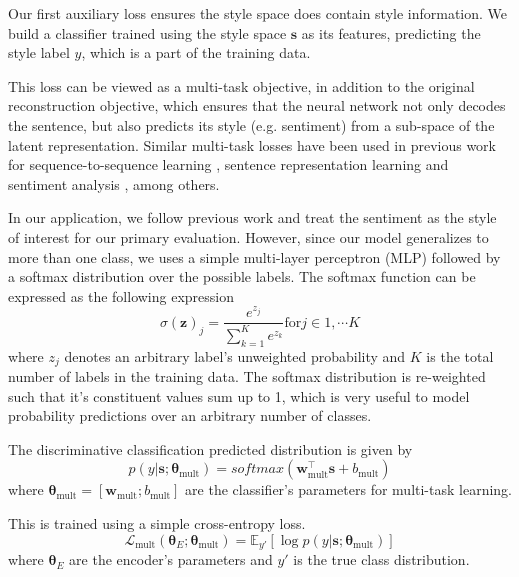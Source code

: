 Our first auxiliary loss ensures the style space does contain style information. We build a classifier trained using the style space $\bm s$ as its features, predicting the style label $y$, which is a part of the training data.

This loss can be viewed as a multi-task objective, in addition to the original reconstruction objective, which ensures that the neural network not only decodes the sentence, but also predicts its style (e.g. sentiment) from a sub-space of the latent representation. Similar multi-task losses have been used in previous work for sequence-to-sequence learning \citep{luong2015multi}, sentence representation learning \citep{jernite2017discourse} and sentiment analysis \citep{balikas2017multitask}, among others.

In our application, we follow previous work \citep{hu2017toward,shen2017style,fu2017style} and treat the sentiment as the style of interest for our primary evaluation. However, since our model generalizes to more than one class, we uses a simple multi-layer perceptron (MLP) followed by a softmax distribution over the possible labels. The softmax function can be expressed as the following expression
\begin{equation*}
	\sigma(\mathbf{z})_j = \frac{e^{z_j}}{\sum_{k=1}^K e^{z_k}} \text{for} j \in {1, \cdots K}
\end{equation*}
where $z_j$ denotes an arbitrary label's unweighted probability and $K$ is the total number of labels in the training data. The softmax distribution is re-weighted such that it's constituent values sum up to 1, which is very useful to model probability predictions over an arbitrary number of classes.

The discriminative classification predicted distribution is given by
\begin{equation} \label{eqn:class-pred}
	p(y | \bm s; \bm\theta_\text{mult}) = softmax(\bm w_\text{mult}^\top \bm s + b_\text{mult})
\end{equation}
where $\bm\theta_\text{mult}=[\bm w_\text{mult}; b_\text{mult}]$ are the classifier's parameters for multi-task learning.

This is trained using a simple cross-entropy loss.
\begin{equation} \label{eqn:multi-task-loss}
	\mathcal{L}_\text{mult}(\bm\theta_{E};\bm\theta_\text{mult}) =
	\mathbb{E}_{y'} [\log p(y | \bm s; \bm\theta_\text{mult})]
\end{equation}
where $\bm\theta_E$ are the encoder's parameters and $y'$ is the true class distribution.


